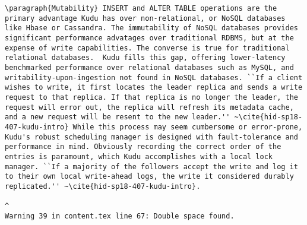 \begin{tiny}
\begin{verbatim}
\paragraph{Mutability} INSERT and ALTER TABLE operations are the primary advantage Kudu has over non-relational, or NoSQL databases like Hbase or Cassandra. The immutability of NoSQL databases provides significant performance advatages over traditional RDBMS, but at the expense of write capabilities. The converse is true for traditional relational databases.  Kudu fills this gap, offering lower-latency benchmarked performance over relational databases such as MySQL, and writability-upon-ingestion not found in NoSQL databases. ``If a client wishes to write, it first locates the leader replica and sends a write request to that replica. If that replica is no longer the leader, the request will error out, the replica will refresh its metadata cache, and a new request will be resent to the new leader.'' ~\cite{hid-sp18-407-kudu-intro} While this process may seem cumbersome or error-prone, Kudu's robust scheduling manager is designed with fault-tolerance and performance in mind. Obviously recording the correct order of the entries is paramount, which Kudu accomplishes with a local lock manager. ``If a majority of the followers accept the write and log it to their own local write-ahead logs, the write it considered durably replicated.'' ~\cite{hid-sp18-407-kudu-intro}.  
                                                                                                                                                                                                                                                                                                                                                                                                                                                                                                                                                                                                                                                                                                                                                                                                                                                                                                                                                                                                                                                                                                                                                                                                                                                                                                 ^
Warning 39 in content.tex line 67: Double space found.

\end{verbatim}
\end{tiny}
